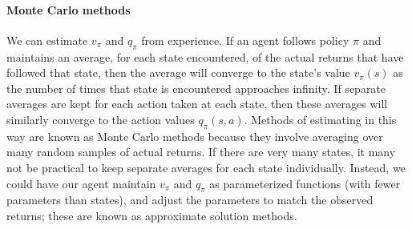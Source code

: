 \documentclass[12pt]{article}
\begin{document}
\begin{figure}[h]
  \centering
\end{figure}


\paragraph{Monte Carlo methods} We can estimate $v_\pi$ and $q_\pi$ from experience. If an agent follows policy $\pi$ and maintains an average, for each state encountered, of the actual returns that have followed that state, then the average will converge to the state's value $v_\pi(s)$ as the number of times that state is encountered approaches infinity. If separate averages are kept for each action taken at each state, then these averages will similarly converge to the action values $q_\pi(s,a)$. Methods of estimating in this way are known as Monte Carlo methods because they involve averaging over many random samples of actual returns. If there are very many states, it many not be practical to keep separate averages for each state individually. Instead, we could have our agent maintain $v_\pi$ and $q_\pi$ as parameterized functions (with fewer parameters than states), and adjust the parameters to match the observed returns; these are known as approximate solution methods.
\end{document}
